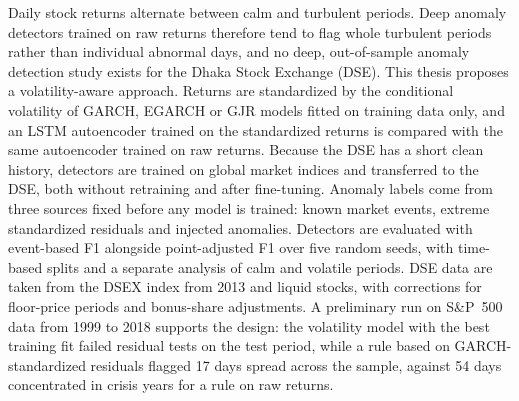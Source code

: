 Daily stock returns alternate between calm and turbulent periods. Deep anomaly detectors
trained on raw returns therefore tend to flag whole turbulent periods rather than
individual abnormal days, and no deep, out-of-sample anomaly detection study exists for the
Dhaka Stock Exchange (DSE). This thesis proposes a volatility-aware approach. Returns are
standardized by the conditional volatility of GARCH, EGARCH or GJR models fitted on
training data only, and an LSTM autoencoder trained on the standardized returns is compared
with the same autoencoder trained on raw returns. Because the DSE has a short clean history,
detectors are trained on global market indices and transferred to the DSE, both without
retraining and after fine-tuning. Anomaly labels come from three sources fixed before any
model is trained: known market events, extreme standardized residuals and injected
anomalies. Detectors are evaluated with event-based F1 alongside point-adjusted F1 over five
random seeds, with time-based splits and a separate analysis of calm and volatile periods.
DSE data are taken from the DSEX index from 2013 and liquid stocks, with corrections for
floor-price periods and bonus-share adjustments. A preliminary run on S\&P~500 data from
1999 to 2018 supports the design: the volatility model with the best training fit failed
residual tests on the test period, while a rule based on GARCH-standardized residuals
flagged 17 days spread across the sample, against 54 days concentrated in crisis years for
a rule on raw returns.
